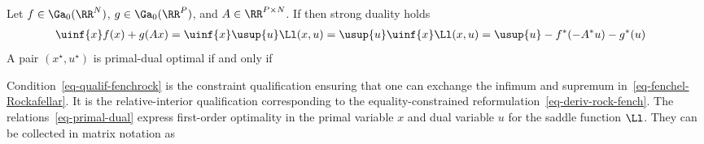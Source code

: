 \begin{thm}\label{thm-fenchel-Rockafellar}
Let $f\in\Ga_0(\RR^N)$, $g\in\Ga_0(\RR^P)$, and $A\in\RR^{P\times N}$. If
then strong duality holds
\begin{align}\label{eq-fenchel-Rockafellar}
	\uinf{x} f(x) + g(Ax) &= \uinf{x} \usup{u} \Ll(x,u) 
	= \usup{u} \uinf{x}\Ll(x,u)  
	= \usup{u} - f^*(-A^*u) - g^*(u)
\end{align}
A pair $(x^\star,u^\star)$ is primal-dual optimal if and only if
\end{thm}

Condition~\eqref{eq-qualif-fenchrock} is the constraint qualification ensuring that one can exchange the infimum and supremum in~\eqref{eq-fenchel-Rockafellar}. It is the relative-interior qualification corresponding to the equality-constrained reformulation~\eqref{eq-deriv-rock-fench}.
%
The relations~\eqref{eq-primal-dual} express first-order optimality in the primal variable $x$ and dual variable $u$ for the saddle function $\Ll$. They can be collected in matrix notation as
